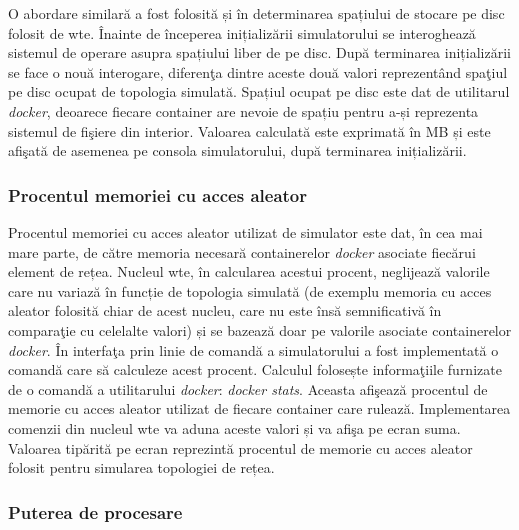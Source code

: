 O abordare similară a fost folosită și în determinarea spațiului de stocare pe disc folosit de \gls{wte}. Înainte de începerea inițializării simulatorului se interoghează sistemul de operare asupra spațiului liber de pe disc. După terminarea inițializării se face o nouă interogare, diferenţa dintre aceste două valori reprezentând spaţiul pe disc ocupat de topologia simulată. Spațiul ocupat pe disc este dat de utilitarul \textit{docker}, deoarece fiecare container are nevoie de spațiu pentru a-și reprezenta sistemul de fişiere din interior. Valoarea calculată este exprimată în MB și este afişată de asemenea pe consola simulatorului, după terminarea inițializării.

\subsubsection{Procentul memoriei cu acces aleator}

Procentul memoriei cu acces aleator utilizat de simulator este dat, în cea mai mare parte, de către memoria necesară containerelor \textit{docker} asociate fiecărui element de rețea. Nucleul \gls{wte}, în calcularea acestui procent, neglijează valorile care nu variază în funcție de topologia simulată (de exemplu memoria cu acces aleator folosită chiar de acest nucleu, care nu este însă semnificativă în comparaţie cu celelalte valori) și se bazează doar pe valorile asociate containerelor \textit{docker}. În interfaţa prin linie de comandă a simulatorului a fost implementată o comandă care să calculeze acest procent. Calculul folosește informaţiile furnizate de o comandă a utilitarului \textit{docker}: \textit{docker stats}. Aceasta afişează procentul de memorie cu acces aleator utilizat de fiecare container care rulează. Implementarea comenzii din nucleul \gls{wte} va aduna aceste valori și va afişa pe ecran suma. Valoarea tipărită pe ecran reprezintă procentul de memorie cu acces aleator folosit pentru simularea topologiei de rețea.

\subsubsection{Puterea de procesare}

